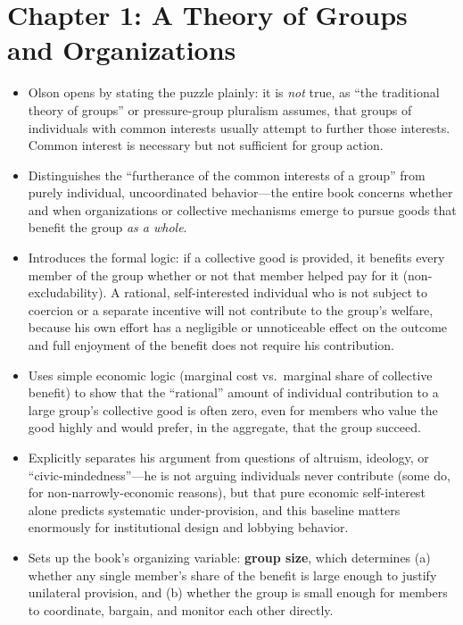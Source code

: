 \documentclass[12pt]{article}
\begin{document}
\section{Chapter 1: A Theory of Groups and Organizations}

\begin{itemize}[leftmargin=*, itemsep=4pt]
    \item Olson opens by stating the puzzle plainly: it is \emph{not} true, as ``the traditional theory of groups'' or pressure-group pluralism assumes, that groups of individuals with common interests usually attempt to further those interests. Common interest is necessary but not sufficient for group action.
    \item Distinguishes the ``furtherance of the common interests of a group'' from purely individual, uncoordinated behavior---the entire book concerns whether and when organizations or collective mechanisms emerge to pursue goods that benefit the group \emph{as a whole}.
    \item Introduces the formal logic: if a collective good is provided, it benefits every member of the group whether or not that member helped pay for it (non-excludability). A rational, self-interested individual who is not subject to coercion or a separate incentive will not contribute to the group's welfare, because his own effort has a negligible or unnoticeable effect on the outcome and full enjoyment of the benefit does not require his contribution.
    \item Uses simple economic logic (marginal cost vs.\ marginal share of collective benefit) to show that the ``rational'' amount of individual contribution to a large group's collective good is often zero, even for members who value the good highly and would prefer, in the aggregate, that the group succeed.
    \item Explicitly separates his argument from questions of altruism, ideology, or ``civic-mindedness''---he is not arguing individuals never contribute (some do, for non-narrowly-economic reasons), but that pure economic self-interest alone predicts systematic under-provision, and this baseline matters enormously for institutional design and lobbying behavior.
    \item Sets up the book's organizing variable: \textbf{group size}, which determines (a) whether any single member's share of the benefit is large enough to justify unilateral provision, and (b) whether the group is small enough for members to coordinate, bargain, and monitor each other directly.
\end{itemize}
\end{document}
